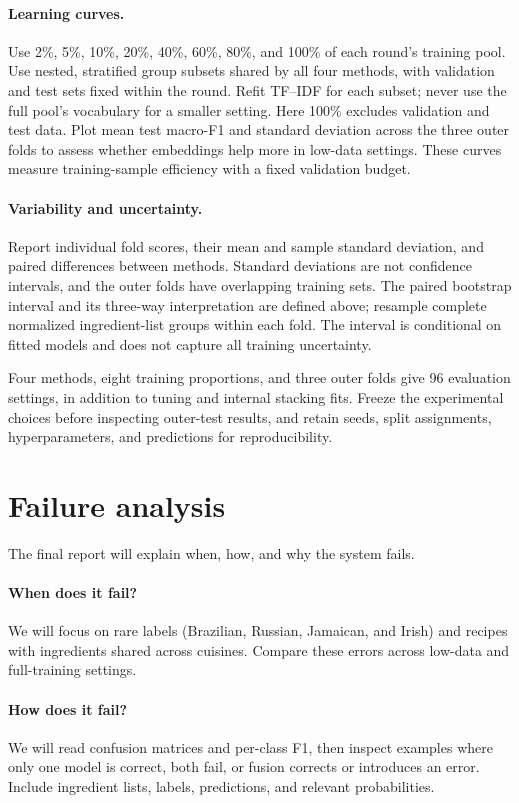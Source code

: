 ﻿\documentclass[11pt,letterpaper]{article}
\begin{document}
\paragraph{Learning curves.}
Use 2\%, 5\%, 10\%, 20\%, 40\%, 60\%, 80\%, and 100\% of each round's training pool. Use nested, stratified group subsets shared by all four methods, with validation and test sets fixed within the round. Refit TF--IDF for each subset; never use the full pool's vocabulary for a smaller setting. Here 100\% excludes validation and test data. Plot mean test macro-F1 and standard deviation across the three outer folds to assess whether embeddings help more in low-data settings. These curves measure training-sample efficiency with a fixed validation budget.

\paragraph{Variability and uncertainty.}
Report individual fold scores, their mean and sample standard deviation, and paired differences between methods. Standard deviations are not confidence intervals, and the outer folds have overlapping training sets. The paired bootstrap interval and its three-way interpretation are defined above; resample complete normalized ingredient-list groups within each fold. The interval is conditional on fitted models and does not capture all training uncertainty.

Four methods, eight training proportions, and three outer folds give 96 evaluation settings, in addition to tuning and internal stacking fits. Freeze the experimental choices before inspecting outer-test results, and retain seeds, split assignments, hyperparameters, and predictions for reproducibility.

\section{Failure analysis}

The final report will explain when, how, and why the system fails.

\paragraph{When does it fail?}
We will focus on rare labels (Brazilian, Russian, Jamaican, and Irish) and recipes with ingredients shared across cuisines. Compare these errors across low-data and full-training settings.

\paragraph{How does it fail?}
We will read confusion matrices and per-class F1, then inspect examples where only one model is correct, both fail, or fusion corrects or introduces an error. Include ingredient lists, labels, predictions, and relevant probabilities.
\end{document}
